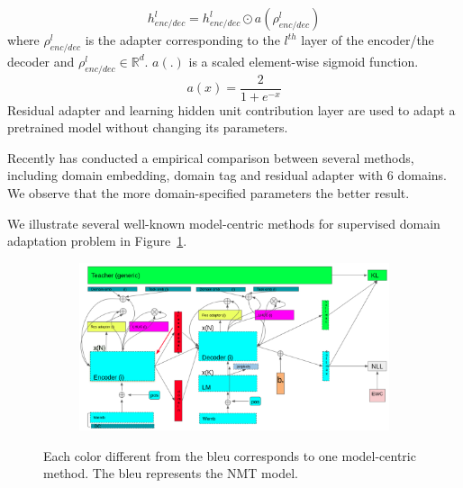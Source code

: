 \begin{equation}
h_{enc/dec}^l = h_{enc/dec}^{l} \odot a(\rho^{l}_{enc/dec})
\end{equation}
where $\rho^{l}_{enc/dec}$ is the adapter corresponding to the $l^{th}$ layer of the encoder/the decoder and $\rho^{l}_{enc/dec} \in \mathbb{R}^d$. $a(.)$ is a scaled
element-wise sigmoid function.
$$a(x) = \frac{2}{1+e^{-x}}$$
Residual adapter and learning hidden unit contribution layer are used to adapt a pretrained model without changing its parameters. 

\cite{Britz17effective}

\cite{Zeng18multidomain}

\cite{Michel2018extreme}

\citet{Jiang20Multi}


Recently \citet{Pham21Revisiting} has conducted a empirical comparison between several methods, including domain embedding, domain tag and residual adapter with 6 domains. We observe that the more domain-specified parameters the better result.

We illustrate several well-known model-centric methods for supervised domain adaptation problem in Figure~\ref{fig:model-centric-case1-case2}.
\begin{figure}[htbp]
\begin{subfigure}{1.0\textwidth}
  \centering
  \includegraphics[width=1.0\textwidth]{graphics/supervised_mdmt}
\end{subfigure}
\newline
\begin{subfigure}{1.0\textwidth}
  \centering
\end{subfigure}
\caption{Each color different from the bleu corresponds to one model-centric method. The bleu represents the NMT model.}
\label{fig:model-centric-case1-case2}
\end{figure}

